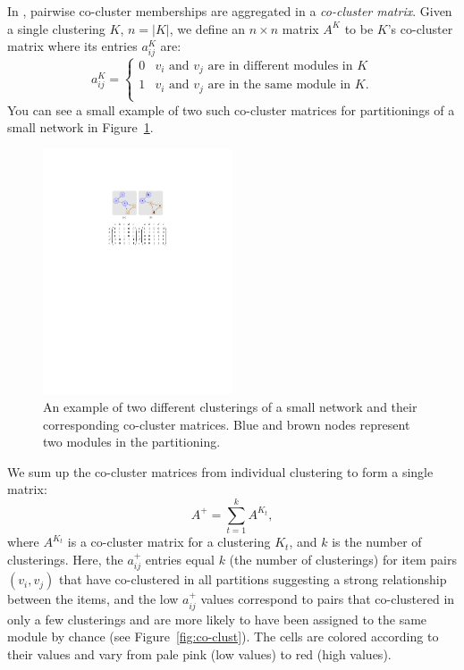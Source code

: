 In \coral, pairwise co-cluster memberships are aggregated in a 
\textit{co-cluster matrix}. Given a single clustering $K$, $n = |K|$, we define 
an $n \times n$ matrix $A^{K}$ to be $K$'s co-cluster matrix where its entries 
$a_{ij}^{K}$ are:
%
\[
 a_{ij}^{K} = 
  \begin{cases}
0 & \text{$v_{i}$ and $v_{j}$ are in different modules in $K$}\\
1 & \text{$v_{i}$ and $v_{j}$ are in the same module in $K$}.\\
  \end{cases}
\]
%
You can see a small example of two such co-cluster matrices for partitionings of
a small network in Figure~\ref{fig:co-clust-example}.
%
\begin{figure}[ht]
  \centering
  \includegraphics[width=0.5\textwidth]{co-clust-example}
  \caption{An example of two different clusterings of a small network and their
  corresponding co-cluster matrices. Blue and brown nodes represent two modules
  in the partitioning.}
  \label{fig:co-clust-example}
\end{figure}
%

We sum up the co-cluster matrices from individual clustering to form a single 
matrix:
%
\[
 A^{+} = \sum_{t=1}^{k} A^{K_{t}},
\]
%
where $A^{K_{t}}$ is a co-cluster matrix for a clustering $K_{t}$, and $k$ is the
number of clusterings. Here, the $a_{ij}^{+}$ entries equal $k$ (the number of 
clusterings) for item pairs $(v_{i}, v_{j})$ that have co-clustered in all 
partitions suggesting a strong relationship between the items, and the low 
$a_{ij}^{+}$ values correspond to pairs that co-clustered in only a few 
clusterings and are more likely to have been assigned to the same module by 
chance (see Figure~\ref{fig:co-clust}). The cells are colored according to their
values and vary from pale pink (low values) to red (high values).


